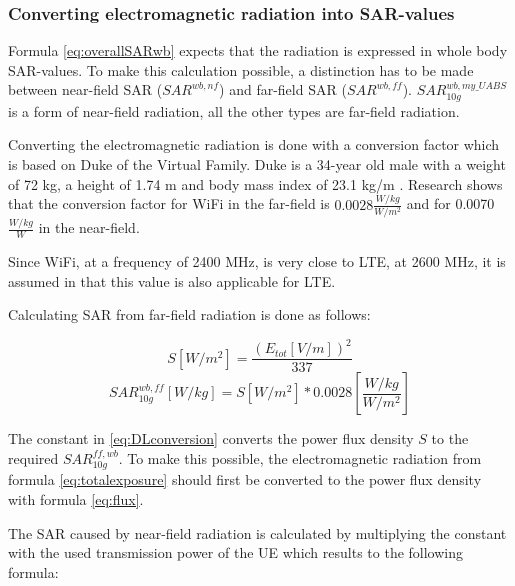 \documentclass[twocolumn]{phdsymp} %
\begin{document}
\subsubsection{Converting electromagnetic radiation into SAR-values}

Formula \ref{eq:overallSARwb} expects that the radiation is expressed in whole body \gls{SAR}-values.
To make this calculation possible, a distinction has to be made between near-field \gls{SAR}
($SAR^{wb,nf}$) and far-field \gls{SAR} ($SAR^{wb,ff}$). $SAR^{wb,my\_UABS}_{10g}$ is a form of near-field radiation, 
all the other types are far-field radiation.

Converting the electromagnetic radiation is done with a conversion factor which is based 
on Duke of the Virtual Family. Duke is a 34-year old male with a weight of 72 kg, a height of 1.74 m and body
mass index of 23.1 kg/m \cite{J22_plets2015joint}. 
Research shows that the conversion factor for WiFi in the far-field is $0.0028 \frac{W/kg}{W/m^2}$
and for 0.0070 $\frac{W/kg}{W}$ \cite{J22_plets2015joint} in the near-field.

Since WiFi, at a frequency of 2400 MHz,
is very close to \gls{LTE}, at 2600 MHz, it is assumed in \cite{J22_plets2015joint} that this value is also applicable for \gls{LTE}.

Calculating \gls{SAR} from far-field radiation is done as follows:

\begin{equation}
S [W/m^2]= \frac{(E_{tot} [V/m])^2}{337}
\label{eq:flux}
\end{equation}
\begin{equation}
SAR^{wb,ff}_{10g} [W/kg]= S [W/m^2]* 0.0028 \left[\frac{W/kg}{W/m^2}\right]
\label{eq:DLconversion}
\end{equation}

The constant in \ref{eq:DLconversion} converts the \gls{power flux density} $S$ to the required $SAR^{ff,wb}_{10g}$.
To make this possible, the electromagnetic radiation
from formula \ref{eq:totalexposure} should first be converted to the  \gls{power flux density} with formula 
\ref{eq:flux}.

The SAR caused by near-field radiation is calculated by multiplying the constant with the used transmission
power of the \gls{UE} which results to the following formula:
\end{document}
